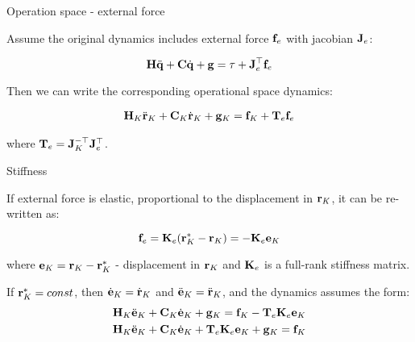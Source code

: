 \documentclass{beamer}
\begin{document}
\begin{frame}{Operation space - external force}
	\begin{flushleft}
		
		Assume the original dynamics includes external force $ \mathbf{f}_e$ with jacobian $\mathbf{J}_e$:
		
		\begin{equation}
			\mathbf{H} \ddot{\mathbf{q}} + \mathbf{C} \dot{\mathbf{q}} + \mathbf{g} = \tau + \mathbf{J}_e^\top \mathbf{f}_e
		\end{equation}
		
		Then we can write the corresponding operational space dynamics:
		
		\begin{align}
	\mathbf{H}_K \ddot{\mathbf{r}}_K + \mathbf{C}_K \dot{\mathbf{r}}_K +
	\mathbf{g} _K
	=  
	\mathbf{f}_K + \mathbf{T}_e \mathbf{f}_e
		\end{align}				
	
	where $\mathbf{T}_e = \mathbf{J}_K^{-\top}\mathbf{J}_e^\top$.
		
	\end{flushleft}
\end{frame}



\begin{frame}{Stiffness}
	\begin{flushleft}
		
		If external force is elastic, proportional to the displacement in $ \mathbf{r}_K$, it can be re-written as:
		
		\begin{equation}
			\mathbf{f}_e = \mathbf{K}_e (\mathbf{r}_K^* - \mathbf{r}_K) = -\mathbf{K}_e \mathbf{e}_K
		\end{equation}
		
		where $\mathbf{e}_K = \mathbf{r}_K - \mathbf{r}_K^*$ - displacement in $ \mathbf{r}_K$ and $\mathbf{K}_e$ is a full-rank stiffness matrix.
		
		\bigskip
		
		If $\mathbf{r}_K^* = const$, then $\dot{\mathbf{e}}_K = \dot{\mathbf{r}}_K$ and $\ddot{\mathbf{e}}_K = \ddot{\mathbf{r}}_K$, and the dynamics assumes the form:
		\begin{align}
	\mathbf{H}_K \ddot{\mathbf{e}}_K + \mathbf{C}_K \dot{\mathbf{e}}_K +
	\mathbf{g} _K
	=  
	\mathbf{f}_K -\mathbf{T}_e \mathbf{K}_e \mathbf{e}_K
	\\
	\mathbf{H}_K \ddot{\mathbf{e}}_K + \mathbf{C}_K \dot{\mathbf{e}}_K +
	\mathbf{T}_e \mathbf{K}_e \mathbf{e}_K	+
	\mathbf{g} _K
	=  
	\mathbf{f}_K
		\end{align}			
		
	\end{flushleft}
\end{frame}
\end{document}

